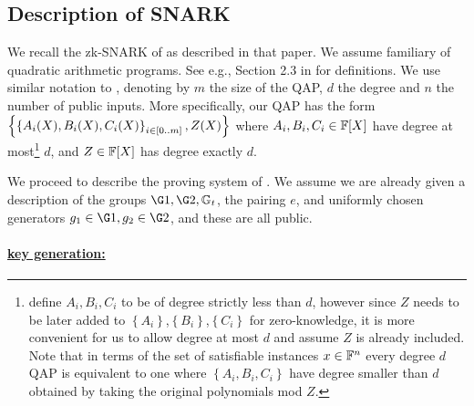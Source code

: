 \documentclass[11pt]{article}
\numberwithin{figure}{section} %
\newcommand{\set}[1]{\ensuremath{\left\{#1\right\}}\xspace}
\begin{document}
\subsection{Description of \cite{BCTV} SNARK}\label{subsec:bctv}

We recall the zk-SNARK of \cite{BCTV} as described in that paper.
We assume familiary of quadratic arithmetic programs.
See e.g., Section 2.3 in \cite{groth16} for definitions.
We use similar notation to \cite{BCTV}, denoting by $m$ the size of the QAP, $d$ the degree and $n$ the number of public inputs.
More specifically, our QAP has the form \set{\sett{A_i(X),B_i(X),C_i(X)}{i\in [0..m]}, Z(X)}
where $A_i,B_i,C_i\in \mathbb F[X]$ have degree at most\footnote{\cite{BCTV} define $A_i,B_i,C_i$ to be of degree strictly less than $d$, however since $Z$ needs to be later added to \set{A_i},\set{B_i},\set{C_i} for zero-knowledge, it is more convenient for us to allow degree at most $d$ and assume $Z$ is already included. Note that in terms of the set of satisfiable instances $x\in \mathbb F^n$ every degree $d$ QAP is equivalent to one where \set{A_i,B_i,C_i} have degree smaller than $d$ obtained by taking the original polynomials mod $Z$.} $d$, and $Z\in \mathbb F[X]$ has degree exactly $d$.


We proceed to describe the proving system of \cite{BCTV}.
We assume we are already given a description of the groups $\G1,\G2,\Gt$, the pairing $e$, and uniformly chosen generators 
$g_1\in \G1,g_2\in \G2$, and these are all public.
\paragraph{\underline{\bctv key generation:}}
\end{document}
